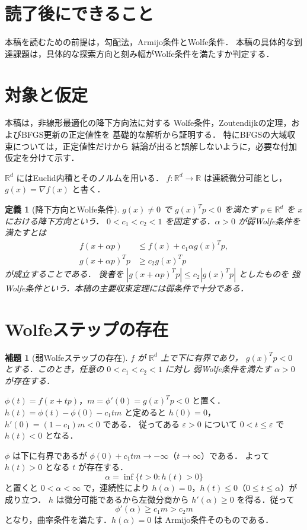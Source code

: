 \documentclass[a5paper,10pt,onecolumn]{jsarticle}
\makeatletter
\theoremstyle{mathnotetheorem}
\newtheorem{definition}[theorem]{定義}
\newtheorem{lemma}[theorem]{補題}
\renewcommand{\proofname}{証明}
\renewenvironment{proof}[1][\proofname]{%
  \par\pushQED{\qed}\normalfont\topsep4\p@\@plus2\p@\relax
  \trivlist\item[\hskip\labelsep\bfseries #1]\ignorespaces
}{\popQED\endtrivlist\@endpefalse}
\makeatother
\begin{document}
\section*{読了後にできること}
本稿を読むための前提は，勾配法，Armijo条件とWolfe条件．
本稿の具体的な到達課題は，具体的な探索方向と刻み幅がWolfe条件を満たすか判定する．

\section{対象と仮定}
本稿は，非線形最適化の降下方向法に対する
Wolfe条件，Zoutendijkの定理，およびBFGS更新の正定値性を
基礎的な解析から証明する．
特にBFGSの大域収束については，正定値性だけから
結論が出ると誤解しないように，必要な付加仮定を分けて示す．

$\mathbb R^d$ にはEuclid内積とそのノルムを用いる．
$f:\mathbb R^d\to\mathbb R$ は連続微分可能とし，
$g(x)=\nabla f(x)$ と書く．

\begin{definition}[降下方向とWolfe条件]
$g(x)\ne0$ で $g(x)^Tp<0$ を満たす $p\in\mathbb R^d$ を
$x$ における\emph{降下方向}という．
$0<c_1<c_2<1$ を固定する．$\alpha>0$ が弱Wolfe条件を満たすとは
\begin{align}
 f(x+\alpha p)&\le f(x)+c_1\alpha g(x)^Tp,\label{eq:armijo}\\
 g(x+\alpha p)^Tp&\ge c_2 g(x)^Tp\label{eq:curv}
\end{align}
が成立することである．
後者を $|g(x+\alpha p)^Tp|\le c_2|g(x)^Tp|$ としたものを
強Wolfe条件という．本稿の主要収束定理には弱条件で十分である．
\end{definition}

\section{Wolfeステップの存在}
\begin{lemma}[弱Wolfeステップの存在]\label{lem:wolfeexist}
$f$ が $\mathbb R^d$ 上で下に有界であり，
$g(x)^Tp<0$ とする．このとき，任意の $0<c_1<c_2<1$ に対し
弱Wolfe条件を満たす $\alpha>0$ が存在する．
\end{lemma}
\begin{proof}
$\phi(t)=f(x+tp)$，$m=\phi'(0)=g(x)^Tp<0$ と置く．
$h(t)=\phi(t)-\phi(0)-c_1tm$ と定めると
$h(0)=0$，$h'(0)=(1-c_1)m<0$ である．
従ってある $\varepsilon>0$ について
$0<t\le\varepsilon$ で $h(t)<0$ となる．

$\phi$ は下に有界であるが
$\phi(0)+c_1tm\to-\infty$（$t\to\infty$）である．
よって $h(t)>0$ となる $t$ が存在する．
\[
 \alpha=\inf\{t>0:h(t)>0\}
\]
と置くと $0<\alpha<\infty$ で，連続性により
$h(\alpha)=0$，$h(t)\le0$（$0\le t\le\alpha$）が成り立つ．
$h$ は微分可能であるから左微分商から
$h'(\alpha)\ge0$ を得る．従って
\[
 \phi'(\alpha)\ge c_1m>c_2m
\]
となり，曲率条件を満たす．$h(\alpha)=0$ は
Armijo条件そのものである．
\end{proof}
\end{document}
